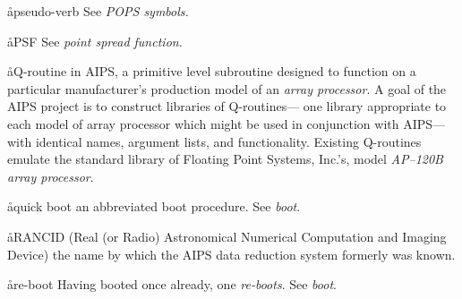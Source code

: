 \aa{pseudo-verb} See {\it POPS symbols.}

\aa{PSF} See {\it point spread function}.

\aa{Q-routine}
in AIPS, a primitive level subroutine designed to function on a
particular manufacturer's production model of an {\it array processor}.
A goal of the AIPS project is to construct libraries of Q-routines---%
one library appropriate to each model of array processor which might
be used in conjunction with AIPS---%
with identical names, argument lists, and functionality.
Existing Q-routines emulate the standard library of Floating Point
Systems, Inc.'s, model {\it AP--120B array processor}.

\aa{quick boot} an abbreviated boot procedure.  See {\it boot}.

\aa{RANCID}
(Real (or Radio) Astronomical Numerical Computation and Imaging Device)
the name by which the AIPS data reduction system formerly was known.

\aa{re-boot}
Having booted once already, one {\it re-boots}.  See {\it boot}.

